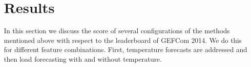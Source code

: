 \documentclass[conference]{IEEEtran}
\begin{document}

\section{Results}
\label{sec:results}
In this section we discuss the score of several configurations of the methods mentioned above with respect to the leaderboard of GEFCom 2014. We do this for different feature combinations. First, temperature forecasts are addressed and then load forecasting with and without temperature.
\end{document}
